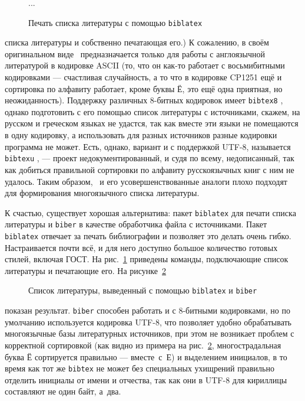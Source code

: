 \documentclass[a4paper,12pt,hyphens]{article}
\newcommand\package[1]{\texttt{#1}}
\newcommand\exe[1]{\texttt{#1}}
\begin{document}
\begin{figure}[tp]
\begin{latexcode}
\usepackage[style=gost-numeric]{biblatex}


...

\printbibliography
\end{latexcode}
\caption{Печать списка литературы с помощью \package{biblatex}}\label{biblatex1}
\end{figure}
списка литературы и собственно печатающая его.)
К сожалению, в своём оригинальном виде \BibTeX\ предназначается только
для работы с англоязычной литературой в кодировке ASCII (то, что
он как-то работает с восьмибитными кодировками --- счастливая случайность,
а то что в кодировке CP1251 ещё и сортировка по алфавиту работает,
кроме буквы Ё, это ещё одна приятная, но неожиданность). Поддержку различных
8-битных кодировок имеет \exe{bibtex8} \parencite{ctan-bibtex8},
однако подготовить с его помощью
список литературы с источниками, скажем, на русском и греческом языках
не удастся, так как вместе эти языки не помещаются в одну кодировку, а
использовать для разных источников разные кодировки программа не может.
Есть, однако, вариант и с поддержкой UTF-8, называется
\exe{bibtexu} \parencite{ctan-bibtexu,se-bibtexu},
--- проект недокументированный, и судя по всему, недописанный, так как
добиться правильной сортировки по алфавиту русскоязычных книг с ним
не удалось. Таким образом, \BibTeX\ и его усовершенствованные аналоги
плохо подходят для формирования многоязычного списка литературы.

К счастью, существует хорошая альтернатива: пакет
\package{biblatex} \parencite{ctan-biblatex,se-biblatex}
для печати списка литературы и
\exe{biber} \parencite{ctan-biber}
в качестве обработчика файла с источниками.
Пакет \package{biblatex} отвечает за печать библиографии и позволяет
это делать очень гибко. Настраивается почти всё, и для него доступно большое
количество готовых стилей, включая ГОСТ. На рис.~\ref{biblatex1}
приведены
команды, подключающие список литературы и печатающие его. На рисунке~\ref{biblatex2}%
\nocite{esin1950,yolkin1997,chebyshev1859,eliseeva2010}%
%
%
\begin{figure}[tp]
\begin{tcolorbox}[colback=white,colframe=white]
\printbibliography[keyword=example,resetnumbers=1]
\end{tcolorbox}
\caption{Список литературы, выведенный с помощью \package{biblatex} и \exe{biber}}\label{biblatex2}
\end{figure}
показан результат.
\exe{biber} способен работать и с 8-битными кодировками, но по умолчанию
используется кодировка UTF-8, что позволяет удобно обрабатывать многоязычные
базы литературных источников, при этом не возникает проблем с корректной сортировкой
(как видно из примера на рис.~\ref{biblatex2}, многострадальная буква Ё
сортируется правильно --- вместе~с~Е) и выделением инициалов, в то время как
тот же \exe{bibtex} не может без специальных ухищрений правильно отделить
инициалы от имени и отчества, так как они в UTF-8 для кириллицы составляют не
один байт, а~два.
\end{document}
